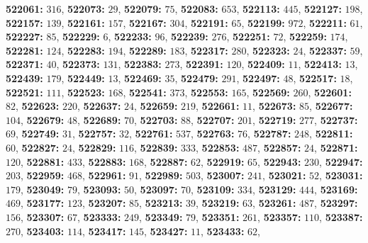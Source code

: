 \textsf{\bfseries 522061:} $316$, \textsf{\bfseries 522073:} $29$, \textsf{\bfseries 522079:} $75$, \textsf{\bfseries 522083:} $653$, \textsf{\bfseries 522113:} $445$, \textsf{\bfseries 522127:} $198$, \textsf{\bfseries 522157:} $139$, \textsf{\bfseries 522161:} $157$, \textsf{\bfseries 522167:} $304$, \textsf{\bfseries 522191:} $65$, \textsf{\bfseries 522199:} $972$, \textsf{\bfseries 522211:} $61$, \textsf{\bfseries 522227:} $85$, \textsf{\bfseries 522229:} $6$, \textsf{\bfseries 522233:} $96$, \textsf{\bfseries 522239:} $276$, \textsf{\bfseries 522251:} $72$, \textsf{\bfseries 522259:} $174$, \textsf{\bfseries 522281:} $124$, \textsf{\bfseries 522283:} $194$, \textsf{\bfseries 522289:} $183$, \textsf{\bfseries 522317:} $280$, \textsf{\bfseries 522323:} $24$, \textsf{\bfseries 522337:} $59$, \textsf{\bfseries 522371:} $40$, \textsf{\bfseries 522373:} $131$, \textsf{\bfseries 522383:} $273$, \textsf{\bfseries 522391:} $120$, \textsf{\bfseries 522409:} $11$, \textsf{\bfseries 522413:} $13$, \textsf{\bfseries 522439:} $179$, \textsf{\bfseries 522449:} $13$, \textsf{\bfseries 522469:} $35$, \textsf{\bfseries 522479:} $291$, \textsf{\bfseries 522497:} $48$, \textsf{\bfseries 522517:} $18$, \textsf{\bfseries 522521:} $111$, \textsf{\bfseries 522523:} $168$, \textsf{\bfseries 522541:} $373$, \textsf{\bfseries 522553:} $165$, \textsf{\bfseries 522569:} $260$, \textsf{\bfseries 522601:} $82$, \textsf{\bfseries 522623:} $220$, \textsf{\bfseries 522637:} $24$, \textsf{\bfseries 522659:} $219$, \textsf{\bfseries 522661:} $11$, \textsf{\bfseries 522673:} $85$, \textsf{\bfseries 522677:} $104$, \textsf{\bfseries 522679:} $48$, \textsf{\bfseries 522689:} $70$, \textsf{\bfseries 522703:} $88$, \textsf{\bfseries 522707:} $201$, \textsf{\bfseries 522719:} $277$, \textsf{\bfseries 522737:} $69$, \textsf{\bfseries 522749:} $31$, \textsf{\bfseries 522757:} $32$, \textsf{\bfseries 522761:} $537$, \textsf{\bfseries 522763:} $76$, \textsf{\bfseries 522787:} $248$, \textsf{\bfseries 522811:} $60$, \textsf{\bfseries 522827:} $24$, \textsf{\bfseries 522829:} $116$, \textsf{\bfseries 522839:} $333$, \textsf{\bfseries 522853:} $487$, \textsf{\bfseries 522857:} $24$, \textsf{\bfseries 522871:} $120$, \textsf{\bfseries 522881:} $433$, \textsf{\bfseries 522883:} $168$, \textsf{\bfseries 522887:} $62$, \textsf{\bfseries 522919:} $65$, \textsf{\bfseries 522943:} $230$, \textsf{\bfseries 522947:} $203$, \textsf{\bfseries 522959:} $468$, \textsf{\bfseries 522961:} $91$, \textsf{\bfseries 522989:} $503$, \textsf{\bfseries 523007:} $241$, \textsf{\bfseries 523021:} $52$, \textsf{\bfseries 523031:} $179$, \textsf{\bfseries 523049:} $79$, \textsf{\bfseries 523093:} $50$, \textsf{\bfseries 523097:} $70$, \textsf{\bfseries 523109:} $334$, \textsf{\bfseries 523129:} $444$, \textsf{\bfseries 523169:} $469$, \textsf{\bfseries 523177:} $123$, \textsf{\bfseries 523207:} $85$, \textsf{\bfseries 523213:} $39$, \textsf{\bfseries 523219:} $63$, \textsf{\bfseries 523261:} $487$, \textsf{\bfseries 523297:} $156$, \textsf{\bfseries 523307:} $67$, \textsf{\bfseries 523333:} $249$, \textsf{\bfseries 523349:} $79$, \textsf{\bfseries 523351:} $261$, \textsf{\bfseries 523357:} $110$, \textsf{\bfseries 523387:} $270$, \textsf{\bfseries 523403:} $114$, \textsf{\bfseries 523417:} $145$, \textsf{\bfseries 523427:} $11$, \textsf{\bfseries 523433:} $62$, 
